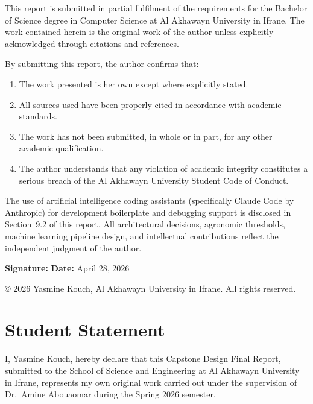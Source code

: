 \documentclass[12pt,a4paper]{report}
\begin{document}
This report is submitted in partial fulfilment of the requirements for the Bachelor of Science degree in Computer Science at Al Akhawayn University in Ifrane. The work contained herein is the original work of the author unless explicitly acknowledged through citations and references.

By submitting this report, the author confirms that:
\begin{enumerate}
  \item The work presented is her own except where explicitly stated.
  \item All sources used have been properly cited in accordance with academic standards.
  \item The work has not been submitted, in whole or in part, for any other academic qualification.
  \item The author understands that any violation of academic integrity constitutes a serious breach of the Al Akhawayn University Student Code of Conduct.
\end{enumerate}

The use of artificial intelligence coding assistants (specifically Claude Code by Anthropic) for development boilerplate and debugging support is disclosed in Section~9.2 of this report. All architectural decisions, agronomic thresholds, machine learning pipeline design, and intellectual contributions reflect the independent judgment of the author.

\vspace{2cm}
\noindent\textbf{Signature:} \underline{\hspace{6cm}} \hfill \textbf{Date:} April 28, 2026

\vspace{1cm}
\noindent\copyright{} 2026 Yasmine Kouch, Al Akhawayn University in Ifrane. All rights reserved.

\chapter*{Student Statement}
\thispagestyle{fancy}

I, Yasmine Kouch, hereby declare that this Capstone Design Final Report, submitted to the School of Science and Engineering at Al Akhawayn University in Ifrane, represents my own original work carried out under the supervision of Dr.\ Amine Abouaomar during the Spring 2026 semester.
\end{document}
